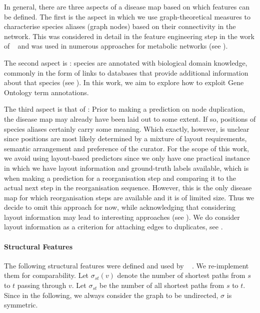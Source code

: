 \documentclass[
	fontsize=10pt, %
	twoside=false, %
	secnumdepth=1, %
  toc=indentunnumbered %
]{kaobook}
\begin{document}
In general, there are three aspects of a disease map based on which features
can be defined. The first is the  aspect in which we use
graph-theoretical measures to characterise species aliases (graph nodes) based
on their connectivity in the network. This was considered in detail in the
feature engineering step in the work of
\citeauthor{nielsen_MachineLearningSupport_2019}~\cite{nielsen_MachineLearningSupport_2019}
and was used in numerous
approaches for metabolic networks (see ).

The second aspect is : species are annotated with biological
domain knowledge, commonly in the form of links to databases that provide
additional information about that species (see ). In
this work, we aim to explore how to exploit Gene Ontology term annotations.

The third aspect is that of : Prior to making a prediction on node
duplication, the disease map may already have been laid out to some extent.
If so, positions of species aliases certainly carry some meaning. Which exactly,
however, is unclear since positions are most likely determined by a mixture of
layout requirements, semantic arrangement and preference of the curator.
%
For the scope of this work, we avoid using layout-based predictors
since we only have one practical instance in which we have layout information
and ground-truth labels available, which is when making a prediction for a
 reorganisation step and comparing it to the actual next
step in the reorganisation sequence. However, this is the only disease map for
which reorganisation steps are available and it is of limited size. Thus we
decide to omit this approach for now, while acknowledging that considering
layout information may lead to interesting approaches (see
). We do consider layout information as a
criterion for attaching edges to duplicates, see . 


\paragraph{Structural Features} The following structural features were defined
and used by \citeauthor{nielsen_MachineLearningSupport_2019}~\cite{nielsen_MachineLearningSupport_2019}
. We re-implement
them for comparability. Let $\sigma_{st}(v)$ denote the number of shortest paths
from $s$ to $t$ passing through $v$. Let $\sigma_{st}$ be the number of all shortest
paths from $s$ to $t$. Since in the following, we always consider the graph to
be undirected, $\sigma$ is symmetric.
\end{document}
